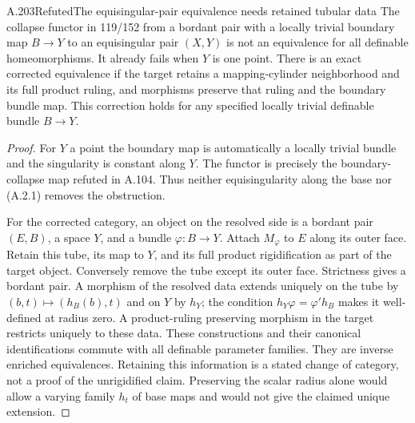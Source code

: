 \begin{saresult}{A.203}{Refuted}{The equisingular-pair equivalence needs retained tubular data}
The collapse functor in 119/152 from a bordant pair with a locally
trivial boundary map $B\to Y$ to an equisingular pair $(X,Y)$ is not
an equivalence for all definable homeomorphisms. It already fails
when $Y$ is one point. There is an exact corrected equivalence if
the target retains a mapping-cylinder neighborhood and its full
product ruling, and morphisms preserve that ruling and the
boundary bundle map. This correction holds for any specified
locally trivial definable bundle $B\to Y$.
\end{saresult}
\begin{proof}
For $Y$ a point the boundary map is automatically a locally trivial
bundle and the singularity is constant along $Y$. The functor is
precisely the boundary-collapse map refuted in A.104. Thus neither
equisingularity along the base nor (A.2.1) removes the obstruction.

For the corrected category, an object on the resolved side is a
bordant pair $(E,B)$, a space $Y$, and a bundle $\varphi:B\to Y$.
Attach $M_\varphi$ to $E$ along its outer face. Retain this tube,
its map to $Y$, and its full product rigidification as part of the target
object. Conversely remove the tube except its outer face. Strictness
gives a bordant pair. A morphism of the resolved data extends uniquely
on the tube by $(b,t)\mapsto(h_B(b),t)$ and on $Y$ by $h_Y$; the
condition $h_Y\varphi=\varphi' h_B$ makes it well-defined at radius
zero. A product-ruling preserving morphism in the target restricts
uniquely to these data. These constructions and their canonical
identifications commute with all definable parameter families.
They are inverse enriched equivalences. Retaining this information
is a stated change of category, not a proof of the unrigidified claim.
Preserving the scalar radius alone would allow a varying family
$h_t$ of base maps and would not give the claimed unique extension.
\end{proof}

